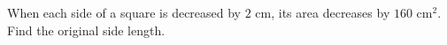 When each side of a square is decreased by $2$ cm, its area decreases by $160$ cm$^2$. Find the original side length.
